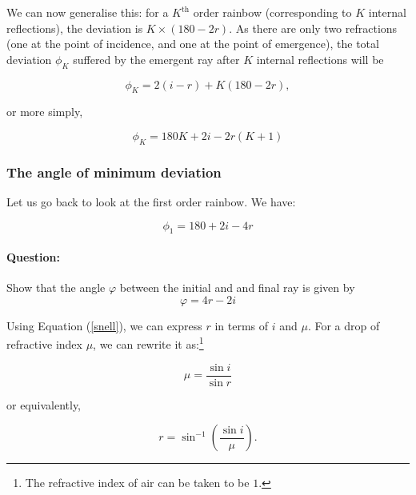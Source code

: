 We can now generalise this: for a $K^\text{th}$ order rainbow (corresponding to $K$ internal reflections), the deviation is $K\times(180 - 2r)$. As there are only two refractions (one at the point of incidence, and one at the point of emergence), the total deviation $\phi_K$ suffered by the emergent ray after $K$ internal reflections will be

\begin{equation*}
    \phi_K = 2(i-r) + K(180-2r),
\end{equation*}

or more simply, 

\begin{equation}
    \phi_K = 180K + 2i - 2r(K+1)
    \label{mindevK}
\end{equation}


\subsubsection*{The angle of minimum deviation}

Let us go back to look at the first order rainbow. We have:

\begin{equation*}
    \phi_1 = 180 + 2 i - 4 r
\end{equation*}

\begin{question}
\paragraph{Question:} Show that the angle $\varphi$ between the initial and and final ray is given by 
\begin{equation}
    \varphi = 4 r - 2 i
\end{equation}
\end{question}


Using Equation (\ref{snell}), we can express $r$ in terms of $i$ and $\mu$. For a drop of refractive index $\mu$, we can rewrite it as:\footnote{The refractive index of air can be taken to be $1$.}

\begin{equation}
    \mu = \frac{\sin{i}}{\sin{r}}
    \label{snellir}
\end{equation}

 or equivalently,
 
 \begin{equation}
     r = \sin^{-1}\left(\frac{\sin{i}}{\mu}\right).
     \label{rasfnofu}
 \end{equation}

